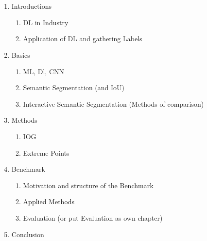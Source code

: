 \chapter{\abstractname}




\begin{enumerate}
	
	\item Introductions
	\begin{enumerate}
		\item DL in Industry
		\item Application of DL and gathering Labels
	\end{enumerate}
	
	\item Basics
	\begin{enumerate}
		\item ML, Dl, CNN
		\item Semantic Segmentation (and IoU)
		\item Interactive Semantic Segmentation (Methods of comparison)
	\end{enumerate}
	
	
	\item Methods
	\begin{enumerate}
		\item IOG
		\item Extreme Points
	\end{enumerate}
	
	
	\item Benchmark
	\begin{enumerate}
		\item Motivation and structure of the Benchmark
		\item Applied Methods
		\item Evaluation (or put Evaluation as own chapter)
	\end{enumerate}
	
	
	\item Conclusion
	
\end{enumerate}
